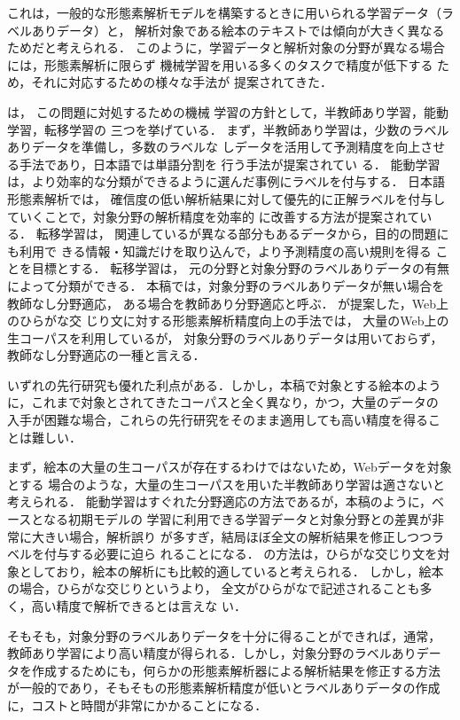 \documentclass[japanese]{jnlp_1.4}
\begin{document}
これは，一般的な形態素解析モデルを構築するときに用いられる学習データ（ラベルありデータ）と，
解析対象である絵本のテキストでは傾向が大きく異なるためだと考えられる．
このように，学習データと解析対象の分野が異なる場合には，形態素解析に限らず
機械学習を用いる多くのタスクで精度が低下する
ため，それに対応するための様々な手法が
提案されてきた．

は，
この問題に対処するための機械
学習の方針として，半教師あり学習，能動学習，転移学習の
三つを挙げている．
まず，半教師あり学習は，少数のラベルありデータを準備し，多数のラベルな
しデータを活用して予測精度を向上させる手法であり，日本語では単語分割を
行う手法が提案されてい
る\cite{Hagiwara:Sekine:2012j}．
能動学習は，より効率的な分類ができるように選んだ事例にラベルを付与する．
日本語形態素解析では，
確信度の低い解析結果に対して優先的に正解ラベルを付与していくことで，対象分野の解析精度を効率的
に改善する方法が提案されている\cite{Mori:2012j,Neubig:Nakata:Mori:2011}．
転移学習は，
関連しているが異なる部分もあるデータから，目的の問題にも利用で
きる情報・知識だけを取り込んで，より予測精度の高い規則を得る
ことを目標とする\cite{Kamishima:2010j}．
転移学習は，
元の分野と対象分野のラベルありデータの有無によって分類ができる．
本稿では，対象分野のラベルありデータが無い場合を教師なし分野適応，
ある場合を教師あり分野適応と呼ぶ．
が提案した，Web上のひらがな交
じり文に対する形態素解析精度向上の手法では，
大量のWeb上の生コーパスを利用しているが，
対象分野のラベルありデータは用いておらず，教師なし分野適応の一種と言える．


いずれの先行研究も優れた利点がある．しかし，本稿で対象とする絵本のよう
に，これまで対象とされてきたコーパスと全く異なり，かつ，大量のデータの
入手が困難な場合，これらの先行研究をそのまま適用しても高い精度を得るこ
とは難しい．

まず，絵本の大量の生コーパスが存在するわけではないため，Webデータを対象とする
場合のような，大量の生コーパスを用いた半教師あり学習は適さないと考えられる．
能動学習はすぐれた分野適応の方法であるが，本稿のように，ベースとなる初期モデルの
学習に利用できる学習データと対象分野との差異が非常に大きい場合，解析誤り
が多すぎ，結局ほぼ全文の解析結果を修正しつつラベルを付与する必要に迫ら
れることになる．
の方法は，ひらがな交じり文を対
象としており，絵本の解析にも比較的適していると考えられる．
しかし，絵本の場合，ひらがな交じりというより，
全文がひらがなで記述されることも多く，高い精度で解析できるとは言えな
い．

そもそも，対象分野のラベルありデータを十分に得ることができれば，通常，
教師あり学習により高い精度が得られる．しかし，対象分野のラベルありデー
タを作成するためにも，何らかの形態素解析器による解析結果を修正する方法
が一般的であり，そもそもの形態素解析精度が低いとラベルありデータの作成
に，コストと時間が非常にかかることになる．
\end{document}
